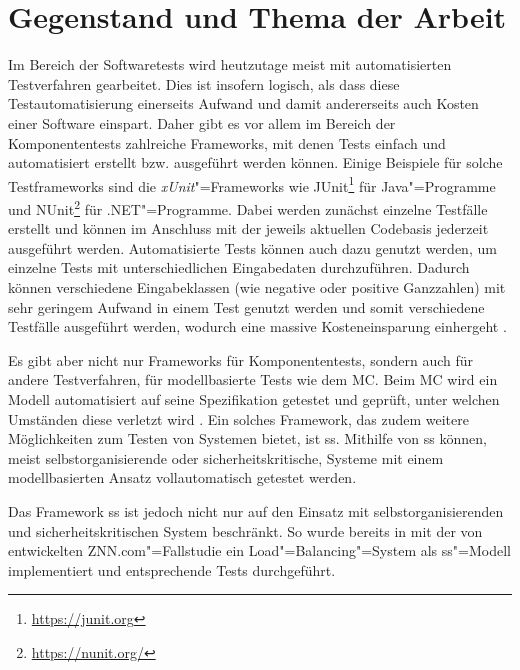 \chapter{Gegenstand und Thema der Arbeit}
\label{ch:intro}

Im Bereich der Softwaretests wird heutzutage meist mit automatisierten Testverfahren gearbeitet.
Dies ist insofern logisch, als dass diese Testautomatisierung einerseits Aufwand und damit andererseits auch Kosten einer Software einspart.
Daher gibt es vor allem im Bereich der Komponententests zahlreiche Frameworks, mit denen Tests einfach und automatisiert erstellt bzw. ausgeführt werden können.
Einige Beispiele für solche Testframeworks sind die \emph{xUnit}"=Frameworks wie JUnit\footnote{\url{https://junit.org}} für Java"=Programme und NUnit\footnote{\url{https://nunit.org/}} für .NET"=Programme.
Dabei werden zunächst einzelne Testfälle erstellt und können im Anschluss mit der jeweils aktuellen Codebasis jederzeit ausgeführt werden.
Automatisierte Tests können auch dazu genutzt werden, um einzelne Tests mit unterschiedlichen Eingabedaten durchzuführen.
Dadurch können verschiedene Eingabeklassen (wie negative oder positive Ganzzahlen) mit sehr geringem Aufwand in einem Test genutzt werden und somit verschiedene Testfälle ausgeführt werden, wodurch eine massive Kosteneinsparung einhergeht \cite{Polo2013}.

Es gibt aber nicht nur Frameworks für Komponententests, sondern auch für andere Testverfahren, \zB für modellbasierte Tests wie dem \gls{MC}.
Beim \gls{MC} wird ein Modell automatisiert auf seine Spezifikation getestet und geprüft, unter welchen Umständen diese verletzt wird \cite{Grumberg1999,Habermaier2015}.
Ein solches Framework, das zudem weitere Möglichkeiten zum Testen von Systemen bietet, ist \gls{ss}.
Mithilfe von \gls{ss} können, meist selbstorganisierende oder sicherheitskritische, Systeme mit einem modellbasierten Ansatz vollautomatisch getestet werden.

Das Framework \gls{ss} ist jedoch nicht nur auf den Einsatz mit selbstorganisierenden und sicherheitskritischen System beschränkt.
So wurde bereits in \cite{Eberhardinger2017} mit der von \citeauthor{Cheng2008} entwickelten ZNN.com"=Fallstudie \cite{Cheng2008} ein Load"=Balancing"=System als \gls{ss}"=Modell implementiert und entsprechende Tests durchgeführt.

